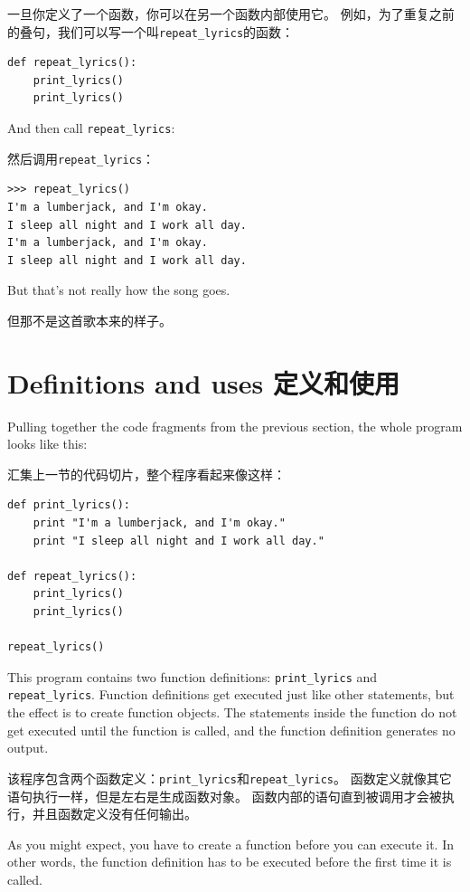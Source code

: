 \documentclass[10pt]{book}
\begin{document}
\begin{CJK}{UTF8}{gbsn}
一旦你定义了一个函数，你可以在另一个函数内部使用它。
例如，为了重复之前的叠句，我们可以写一个叫\verb"repeat_lyrics"的函数：

\begin{verbatim}
def repeat_lyrics():
    print_lyrics()
    print_lyrics()
\end{verbatim}
%
And then call \verb"repeat_lyrics":

然后调用\verb"repeat_lyrics"：

\begin{verbatim}
>>> repeat_lyrics()
I'm a lumberjack, and I'm okay.
I sleep all night and I work all day.
I'm a lumberjack, and I'm okay.
I sleep all night and I work all day.
\end{verbatim}
%
But that's not really how the song goes.

但那不是这首歌本来的样子。

\section{Definitions and uses 定义和使用}

Pulling together the code fragments from the previous section, the
whole program looks like this:

汇集上一节的代码切片，整个程序看起来像这样：

\begin{verbatim}
def print_lyrics():
    print "I'm a lumberjack, and I'm okay."
    print "I sleep all night and I work all day."

def repeat_lyrics():
    print_lyrics()
    print_lyrics()

repeat_lyrics()
\end{verbatim}
%
This program contains two function definitions: \verb"print_lyrics" and
\verb"repeat_lyrics".  Function definitions get executed just like other
statements, but the effect is to create function objects.  The statements
inside the function do not get executed until the function is called, and
the function definition generates no output.

该程序包含两个函数定义：\verb"print_lyrics"和\verb"repeat_lyrics"。
函数定义就像其它语句执行一样，但是左右是生成函数对象。
函数内部的语句直到被调用才会被执行，并且函数定义没有任何输出。

As you might expect, you have to create a function before you can
execute it.  In other words, the function definition has to be
executed before the first time it is called.


\end{CJK}
\end{document}
